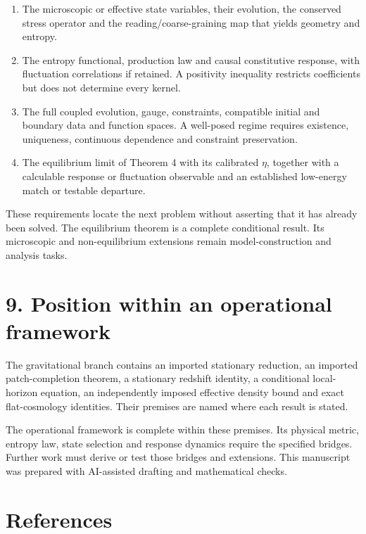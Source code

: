 \documentclass[
  11pt,
  a4paper,
]{article}
\providecommand{\tightlist}{%
  \setlength{\itemsep}{0pt}\setlength{\parskip}{0pt}}
\begin{document}
\begin{enumerate}
\def\labelenumi{\arabic{enumi}.}
\tightlist
\item
  The microscopic or effective state variables, their evolution, the conserved stress operator and the reading/coarse-graining map that yields geometry and entropy.
\item
  The entropy functional, production law and causal constitutive response, with fluctuation correlations if retained. A positivity inequality restricts coefficients but does not determine every kernel.
\item
  The full coupled evolution, gauge, constraints, compatible initial and boundary data and function spaces. A well-posed regime requires existence, uniqueness, continuous dependence and constraint preservation.
\item
  The equilibrium limit of Theorem 4 with its calibrated \(\eta\), together with a calculable response or fluctuation observable and an established low-energy match or testable departure.
\end{enumerate}

These requirements locate the next problem without asserting that it has already been solved. The equilibrium theorem is a complete conditional result. Its microscopic and non-equilibrium extensions remain model-construction and analysis tasks.

\section{9. Position within an operational framework}\label{position-within-an-operational-framework}

The gravitational branch contains an imported stationary reduction, an imported patch-completion theorem, a stationary redshift identity, a conditional local-horizon equation, an independently imposed effective density bound and exact flat-cosmology identities. Their premises are named where each result is stated.

The operational framework is complete within these premises. Its physical metric, entropy law, state selection and response dynamics require the specified bridges. Further work must derive or test those bridges and extensions. This manuscript was prepared with AI-assisted drafting and mathematical checks.

\section{References}\label{references}
\end{document}
